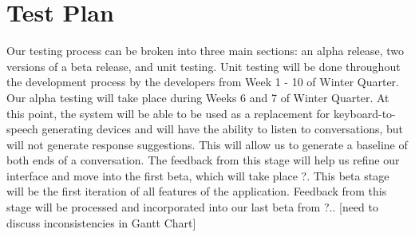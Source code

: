 \chapter{Test Plan}

Our testing process can be broken into three main sections: an alpha release, two versions of a beta release, and unit testing. Unit testing will be done throughout the development process by the developers from Week 1 - 10 of Winter Quarter. Our alpha testing will take place during Weeks 6 and 7 of Winter Quarter. At this point, the system will be able to be used as a replacement for keyboard-to-speech generating devices and will have the ability to listen to conversations, but will not generate response suggestions. This will allow us to generate a baseline of both ends of a conversation. The feedback from this stage will help us refine our interface and move into the first beta, which will take place ?. This beta stage will be the first iteration of all features of the application. Feedback from this stage will be processed and incorporated into our last beta from ?.. [need to discuss inconsistencies in Gantt Chart]
